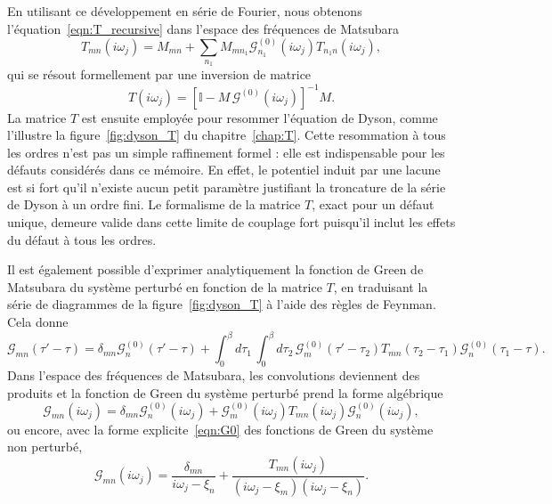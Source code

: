 En utilisant ce développement en série de Fourier, nous obtenons l'équation~\eqref{eqn:T_recursive} dans l'espace des fréquences de Matsubara
\begin{equation}
    T_{mn}(i\omega_j) = M_{mn}+\sum_{n_1}M_{mn_1}\mathcal{G}^{(0)}_{n_1}(i\omega_j)T_{n_1n}(i\omega_j),
    \label{eqn:T_indices}
\end{equation}
qui se résout formellement par une inversion de matrice
\begin{equation}
    T(i\omega_j) = \left[\mathbb{I}-M\,\mathcal{G}^{(0)}(i\omega_j)\right]^{-1}M.
    \label{eqn:T_fermee}
\end{equation}
La matrice $T$ est ensuite employée pour resommer l'équation de Dyson, comme l'illustre la figure~\ref{fig:dyson_T} du chapitre~\ref{chap:T}. Cette resommation à tous les ordres n'est pas un simple raffinement formel : elle est indispensable pour les défauts considérés dans ce mémoire. En effet, le potentiel induit par une lacune est si fort qu'il n'existe aucun petit paramètre justifiant la troncature de la série de Dyson à un ordre fini. Le formalisme de la matrice $T$, exact pour un défaut unique, demeure valide dans cette limite de couplage fort puisqu'il inclut les effets du défaut à tous les ordres.

Il est également possible d'exprimer analytiquement la fonction de Green de Matsubara du système perturbé en fonction de la matrice $T$, en traduisant la série de diagrammes de la figure~\ref{fig:dyson_T} à l'aide des règles de Feynman. Cela donne
\begin{equation}
    \mathcal{G}_{mn}(\tau'-\tau) = \delta_{mn}\mathcal{G}^{(0)}_n(\tau'-\tau) + \int_0^\beta d\tau_1\,\int_0^\beta d\tau_2\,\mathcal{G}^{(0)}_m(\tau'-\tau_2)T_{mn}(\tau_2-\tau_1)\mathcal{G}^{(0)}_n(\tau_1-\tau).
\end{equation}
Dans l'espace des fréquences de Matsubara, les convolutions deviennent des produits et la fonction de Green du système perturbé prend la forme algébrique
\begin{equation}
    \mathcal{G}_{mn}(i\omega_j) =\delta_{mn}\mathcal{G}_n^{(0)}(i\omega_j)+\mathcal{G}^{(0)}_m(i\omega_j)T_{mn}(i\omega_j)\mathcal{G}^{(0)}_n(i\omega_j),
    \label{eqn:G_T}
\end{equation}
ou encore, avec la forme explicite~\eqref{eqn:G0} des fonctions de Green du système non perturbé,
\begin{equation}
    \mathcal{G}_{mn}(i\omega_j) = \frac{\delta_{mn}}{i\omega_j-\xi_n}+\frac{T_{mn}(i\omega_j)}{(i\omega_j-\xi_m)(i\omega_j-\xi_n)}.
    \label{eqn:G_T_explicite}
\end{equation}

